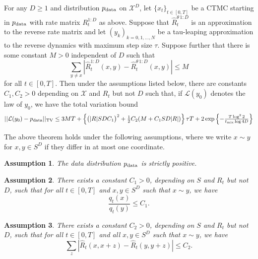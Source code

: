 \documentclass{article}
\newtheorem{assumption}{Assumption}
\begin{document}
\setcounter{theorem}{0}
\begin{theorem}
For any $D \geq 1$ and distribution $p_{\textup{data}}$ on $\mathcal{X}^D$, let $\{x_t\}_{t \in [0,T]}$ be a CTMC starting in $p_{\textup{data}}$ with rate matrix $R^{1:D}_t$ as above. Suppose that $\hat{R}_t^{\theta \, 1:D}$ is an approximation to the reverse rate matrix and let $(y_k)_{k = 0, 1, \dots, N}$ be a tau-leaping approximation to the reverse dynamics with maximum step size $\tau$. Suppose further that there is some constant $M > 0$ independent of $D$ such that
\begin{equation}
    \sum_{y \neq x} \left| \hat R_t^{1:D}(x,y) - \hat{R}_t^{\theta \, 1:D}(x,y) \right| \leq M
\end{equation}
for all $t \in [0,T]$. Then under the assumptions listed below, there are constants $C_1, C_2 > 0$ depending on $\mathcal{X}$ and $R_t$ but not $D$ such that, if $\mathcal{L}(y_0)$ denotes the law of $y_0$, we have the total variation bound
\begin{equation}
\textstyle
    ||\mathcal{L}(y_0) - p_{\textup{data}}||_{\textup{TV}} \leq 3MT + \left\{ \big(|R|SDC_1\big)^2 + \frac{1}{2} C_2(M + C_1 SD|R|) \right\} \tau T + 2 \exp \left \{ - \frac{T \log^2 2}{t_{\textup{mix}} \log 4D} \right \}
\end{equation}
\end{theorem}
\setcounter{theorem}{2}

The above theorem holds under the following assumptions, where we write $x \sim y$ for $x,y \in S^D$ if they differ in at most one coordinate.

\begin{assumption}
\label{ass:positivity}
The data distribution $p_{\textup{data}}$ is strictly positive.
\end{assumption}

\begin{assumption}
\label{ass:bounded_ratios}
There exists a constant $C_1 > 0$, depending on $S$ and $R_t$ but not $D$, such that for all $t \in [0,T]$ and $x,y \in S^D$ such that $x \sim y$, we have
\begin{equation}
\label{eq:bounded_ratios}
    \frac{q_t(x)}{q_t(y)} \leq C_1.
\end{equation}
\end{assumption}

\begin{assumption}
\label{ass:bounded_rate_change}
There exists a constant $C_2 > 0$, depending on $S$ and $R_t$ but not $D$, such that for all $t \in [0,T]$ and all $x,y \in S^D$ such that $x \sim y$, we have
\begin{equation}
\label{eq:error_bound_assumption_2}
    \sum_z \left|\hat R_t(x,x+z) - \hat R_t(y,y+z)\right| \leq C_2.
\end{equation}
\end{assumption}
\end{document}
